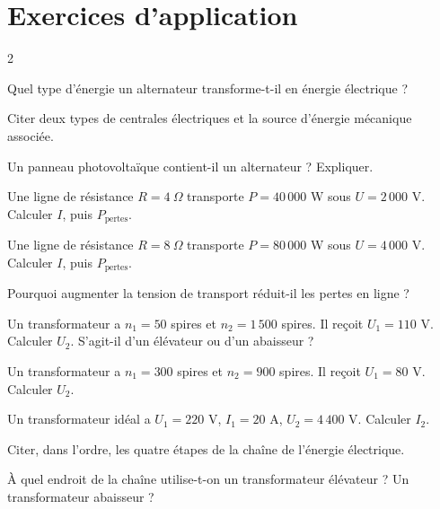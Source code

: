 \section{Exercices d'application}
\begin{multicols}{2}

\exo{} Quel type d'énergie un alternateur transforme-t-il en énergie électrique ?

\exo{} Citer deux types de centrales électriques et la source d'énergie mécanique
associée.

\exo{} Un panneau photovoltaïque contient-il un alternateur ? Expliquer.

\exo{} Une ligne de résistance $R=4\ \Omega$ transporte $P=40\,000$ W sous
$U=2\,000$ V. Calculer $I$, puis $P_{\text{pertes}}$.

\exo{} Une ligne de résistance $R=8\ \Omega$ transporte $P=80\,000$ W sous
$U=4\,000$ V. Calculer $I$, puis $P_{\text{pertes}}$.

\exo{} Pourquoi augmenter la tension de transport réduit-il les pertes en ligne ?

\exo{} Un transformateur a $n_1=50$ spires et $n_2=1\,500$ spires. Il reçoit
$U_1=110$ V. Calculer $U_2$. S'agit-il d'un élévateur ou d'un abaisseur ?

\exo{} Un transformateur a $n_1=300$ spires et $n_2=900$ spires. Il reçoit
$U_1=80$ V. Calculer $U_2$.

\exo{} Un transformateur idéal a $U_1=220$ V, $I_1=20$ A, $U_2=4\,400$ V. Calculer
$I_2$.

\exo{} Citer, dans l'ordre, les quatre étapes de la chaîne de l'énergie électrique.

\exo{} À quel endroit de la chaîne utilise-t-on un transformateur élévateur ? Un
transformateur abaisseur ?

\end{multicols}


